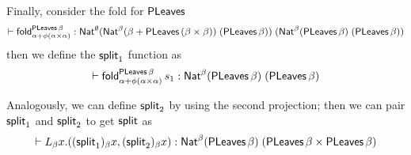 \documentclass[acmsmall,review,anonymous]{acmart}
\theoremstyle{definition}
\begin{document}
Finally, consider the fold for $\mathsf{PLeaves}$
\[
	\vdash \mathsf{fold}_{\alpha + \phi(\alpha \times \alpha)}^{\mathsf{PLeaves}\,\beta}
	: \mathsf{Nat}^{\emptyset}
	(\mathsf{Nat}^{\beta} (\beta + \mathsf{PLeaves}\,(\beta \times \beta)) \; (\mathsf{PLeaves}\,\beta))\;
	(\mathsf{Nat}^{\beta} (\mathsf{PLeaves}\,\beta) \; (\mathsf{PLeaves}\,\beta))
\]
then we define the $\mathsf{split}_1$ function as
\[
	\vdash \mathsf{fold}_{\alpha + \phi(\alpha \times \alpha)}^{\mathsf{PLeaves}\, \beta}\, s_1
	: \mathsf{Nat}^{\beta} (\mathsf{PLeaves}\,\beta) \; (\mathsf{PLeaves}\,\beta)
\]

Analogously, we can define $\mathsf{split}_2$ by using the second projection;
then we can pair $\mathsf{split}_1$ and $\mathsf{split}_2$ to get $\mathsf{split}$ as
\[
	\vdash L_{\beta} x. ((\mathsf{split}_1)_{\beta} x, (\mathsf{split}_2)_{\beta} x)
	: \mathsf{Nat}^{\beta} (\mathsf{PLeaves}\,\beta) \; (\mathsf{PLeaves}\,\beta \times \mathsf{PLeaves}\,\beta)
\]
\end{document}
